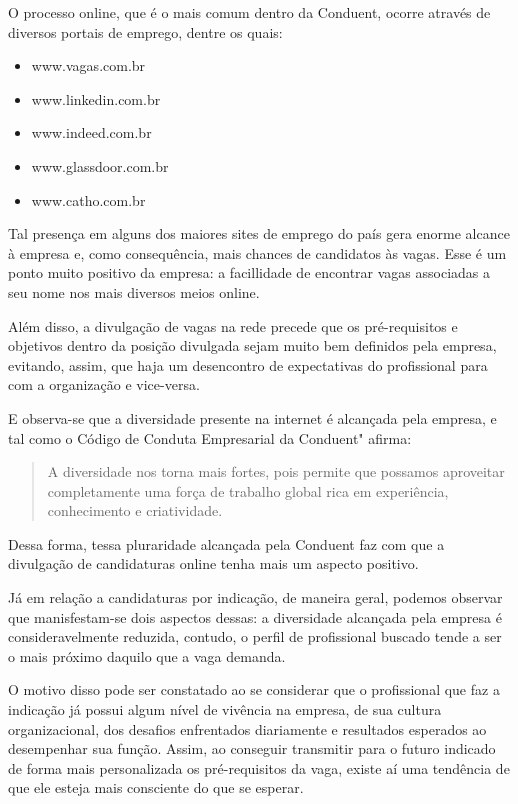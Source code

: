 \documentclass[12pt]{article}
\begin{document}
O processo online, que é o mais comum dentro da Conduent, ocorre através de diversos portais de emprego, dentre os quais:

\begin{itemize}
\item www.vagas.com.br
\item www.linkedin.com.br
\item www.indeed.com.br
\item www.glassdoor.com.br
\item www.catho.com.br
\end{itemize} 

Tal presença em alguns dos maiores sites de emprego do país gera enorme alcance à empresa e, como consequência, mais chances de candidatos às vagas. Esse é um ponto muito positivo da empresa: a facillidade de encontrar vagas associadas a seu nome nos mais diversos meios online.

Além disso, a divulgação de vagas na rede precede que os pré-requisitos e objetivos dentro da posição divulgada sejam muito bem definidos pela empresa, evitando, assim, que haja um desencontro de expectativas do profissional para com a organização e vice-versa. 

E observa-se que a diversidade  presente na internet é alcançada pela empresa, e tal como o Código de Conduta Empresarial da Conduent" afirma: 

\begin{quote}
A diversidade nos torna mais fortes, pois permite que possamos aproveitar completamente uma força de trabalho global rica em experiência, conhecimento e criatividade.
\end{quote}


Dessa forma, tessa pluraridade alcançada pela Conduent faz com que a divulgação de candidaturas online tenha mais um aspecto positivo. 

Já em relação a candidaturas por indicação, de maneira geral, podemos observar que manisfestam-se dois aspectos dessas: a diversidade alcançada pela empresa é consideravelmente reduzida, contudo, o perfil de profissional buscado tende a ser o mais próximo daquilo que a vaga demanda. 

O motivo disso pode ser constatado ao se considerar que o profissional que faz a indicação já possui algum nível de vivência na empresa, de sua cultura organizacional, dos desafios enfrentados diariamente e resultados esperados ao desempenhar sua função. Assim, ao conseguir transmitir para o futuro indicado de forma mais personalizada os pré-requisitos da vaga, existe aí uma tendência de que ele esteja mais consciente do que se esperar.  
\end{document}

